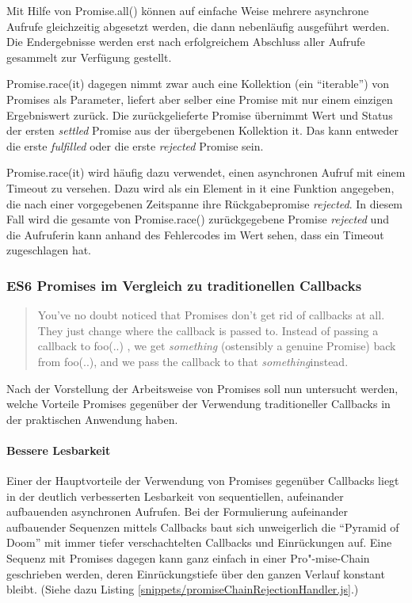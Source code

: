 \documentclass[
11pt, %
a4paper, %
oneside, %
pdfspacing, %
headinclude,
BCOR5mm, %
ngerman, %
bibtotocnumbered,
]{scrartcl}
\begin{document}
			Mit Hilfe von \textsf{Promise.all()} können auf einfache Weise mehrere asynchrone Aufrufe gleichzeitig abgesetzt werden, die dann nebenläufig ausgeführt werden. Die Endergebnisse werden erst nach erfolgreichem Abschluss aller Aufrufe gesammelt zur Verfügung gestellt.
			
			\textsf{Promise.race(it)} dagegen nimmt zwar auch eine Kollektion (ein "`iterable"') von Promises als Parameter, liefert aber selber eine Promise mit nur einem einzigen Ergebniswert zurück. Die zurückgelieferte Promise übernimmt Wert und Status der ersten \emph{settled} Promise aus der übergebenen Kollektion \textsf{it}. Das kann entweder die erste \emph{fulfilled} oder die erste \emph{rejected} Promise sein.
			
			\textsf{Promise.race(it)} wird häufig dazu verwendet, einen asynchronen Aufruf mit einem Timeout zu versehen. Dazu wird als ein Element in \textsf{it} eine Funktion angegeben, die nach einer vorgegebenen Zeitspanne ihre Rückgabepromise \emph{rejected}. In diesem Fall wird die gesamte von \textsf{Promise.race()} zurückgegebene Promise \emph{rejected} und die Aufruferin kann anhand des Fehlercodes im Wert sehen, dass ein Timeout zugeschlagen hat.

		\subsubsection{ES6 Promises im Vergleich zu traditionellen Callbacks}
		
		\begin{quote}
			You've no doubt noticed that Promises don't get rid of callbacks at all. They just change where the callback is passed to. Instead of passing a callback to foo(..) , we get \textit{something }(ostensibly a genuine Promise) back from foo(..), and we pass the callback to that \textit{something}instead.~\citep[S.~52]{Simpson.2015}
		\end{quote}
		
		Nach der Vorstellung der Arbeitsweise von Promises soll nun untersucht werden, welche Vorteile Promises gegenüber der Verwendung traditioneller Callbacks in der praktischen Anwendung haben. 

	
		
		\paragraph{Bessere Lesbarkeit}
		Einer der Hauptvorteile der Verwendung von Promises gegenüber Callbacks liegt in der deutlich verbesserten Lesbarkeit von sequentiellen, aufeinander aufbauenden asynchronen Aufrufen. Bei der Formulierung aufeinander aufbauender Sequenzen mittels Callbacks baut sich unweigerlich die "`Pyramid of Doom"' mit immer tiefer verschachtelten Callbacks und Einrückungen auf. 
		Eine Sequenz mit Promises dagegen kann ganz einfach in einer Pro"-mise-Chain geschrieben werden, deren Einrückungstiefe über den ganzen Verlauf konstant bleibt. (Siehe dazu Listing \ref{snippets/promiseChainRejectionHandler.js}.)
		
\end{document}
